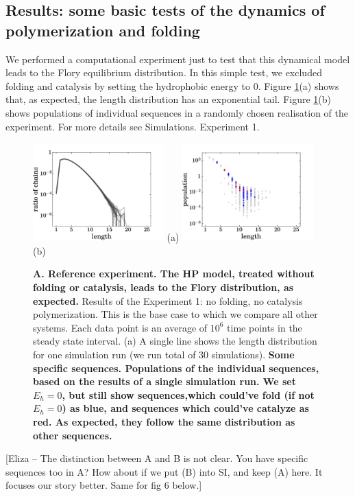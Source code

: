 \documentclass[journal=jacsat,manuscript=article,layout=twocolumn]{achemso}
\begin{document}
\subsection{Results: some basic tests of the dynamics of polymerization and folding}

 We performed a computational experiment just to test that this dynamical model leads to the 
 Flory equilibrium distribution.  In this simple test, we excluded folding and catalysis by setting 
the hydrophobic energy to $0$. Figure \ref{fig:sim_pure_flory}(a) shows that, as expected, the 
length 
distribution has an exponential tail. Figure \ref{fig:sim_pure_flory}(b) shows populations of 
individual sequences in a randomly chosen realisation of the experiment. For more details see 
Simulations. Experiment 1.

\begin{figure}[hbt!]
  \centering
  \includegraphics[width=0.45\textwidth]{pictures/distrPlain-many.pdf} (a)
  \includegraphics[width=0.45\textwidth]{pictures/scatter01918.png} (b)
  \caption{\footnotesize{\textbf{A.  Reference experiment.  The HP model, treated without folding 
or catalysis, leads to the Flory distribution, as expected.}  Results of the Experiment 1: no 
folding, no catalysis polymerization. This 
is the base case to which we compare all other systems. Each data point is an average of 
$10^6$ time points in the steady state interval. (a) A single line shows the length distribution for one simulation run (we run total of 30 simulations). \bf{Some specific sequences.}  Populations of the individual sequences, based 
on the results of a single simulation run. 
We set $E_h=0$, but still show sequences,which could've fold (if not $E_h=0$) as 
blue, and sequences which could've catalyze as red. As expected, they follow the same distribution 
as other sequences.}}
  \label{fig:sim_pure_flory}
\end{figure}
[Eliza -- The distinction between A and B is not clear.  You have specific sequences too in A?  How about if we put (B) into SI, and keep (A) here.  It focuses our story better.  Same for fig 6 below.]
\end{document}
